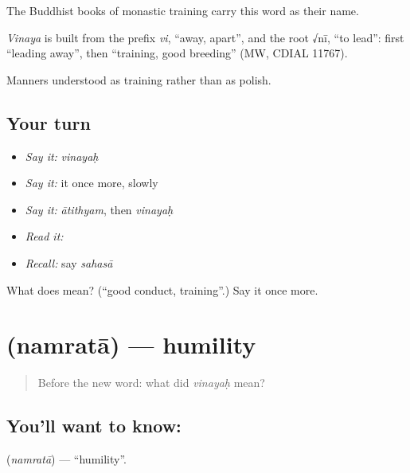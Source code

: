 The Buddhist books of monastic training carry this word as their name.

\begin{cousinweb}
\emph{Vinaya} is built from the prefix \emph{vi}, \textquotedblleft{}away, apart\textquotedblright{}, and the root √nī, \textquotedblleft{}to lead\textquotedblright{}: first \textquotedblleft{}leading away\textquotedblright{}, then \textquotedblleft{}training, good breeding\textquotedblright{} (MW, CDIAL 11767).
\end{cousinweb}

\begin{grammarlens}[title={What you've built}]
Manners understood as training rather than as polish.
\end{grammarlens}

\subsection*{Your turn}
\begin{itemize}
\raggedright
  \item \emph{Say it:} \emph{vinayaḥ}
  \item \emph{Say it:} it once more, slowly
  \item \emph{Say it:} \emph{ātithyam}, then \emph{vinayaḥ}
  \item \emph{Read it:} \textbf{}
  \item \emph{Recall:} say \emph{sahasā}
\end{itemize}

\begin{tcolorbox}[breakable,colback=teal!4,colframe=teal!35!black,title={Before you move on}]
What does  mean? (\textquotedblleft{}good conduct, training\textquotedblright{}.) Say it once more.
\end{tcolorbox}
\section[\texorpdfstring{\sk{नम्रता} (namratā)}{नम्रता (namratā)}]{ (namratā) — humility}

\label{lesson:SA-C43-humility}



\begin{quote}
Before the new word: what did \emph{vinayaḥ} mean?
\end{quote}

\subsection*{You'll want to know: }
\textbf{} (\emph{namratā}) — \textquotedblleft{}humility\textquotedblright{}.


